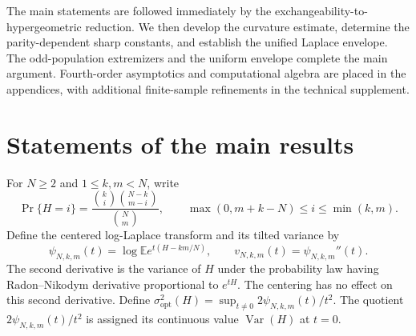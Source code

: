 \documentclass[11pt,a4paper]{article}
\DeclareMathOperator{\Var}{Var}\DeclareMathOperator{\Cov}{Cov}\DeclareMathOperator{\Hyp}{Hyp}\DeclareMathOperator{\Bern}{Bern}\DeclareMathOperator{\supp}{supp}\DeclareMathOperator{\artanh}{artanh}
\newcommand{\E}{\mathbb E}\newcommand{\R}{\mathbb R}\newcommand{\N}{\mathbb N}\newcommand{\one}{\mathbf1}
\begin{document}
The main statements are followed immediately by the exchangeability-to-hypergeometric reduction. We then develop the curvature estimate, determine the parity-dependent sharp constants, and establish the unified Laplace envelope. The odd-population extremizers and the uniform envelope complete the main argument. Fourth-order asymptotics and computational algebra are placed in the appendices, with additional finite-sample refinements in the technical supplement.

\section{Statements of the main results}\label{sec:main}
For $N\ge2$ and $1\le k,m<N$, write
\begin{equation}\label{eq:hypergeom}
 \Pr\{H=i\}=\frac{\binom ki\binom{N-k}{m-i}}{\binom Nm},
 \qquad \max(0,m+k-N)\le i\le\min(k,m).
\end{equation}
Define the centered log-Laplace transform and its tilted variance by
\begin{equation}\label{eq:psi}
 \psi_{N,k,m}(t)=\log\E e^{t(H-km/N)},\qquad
 v_{N,k,m}(t)=\psi_{N,k,m}''(t).
\end{equation}
The second derivative is the variance of $H$ under the probability law having Radon--Nikodym derivative proportional to $e^{tH}$. The centering has no effect on this second derivative. Define $\sigma^2_{\mathrm{opt}}(H)=\sup_{t\ne0}2\psi_{N,k,m}(t)/t^2$. The quotient $2\psi_{N,k,m}(t)/t^2$ is assigned its continuous value $\Var(H)$ at $t=0$.
\end{document}
